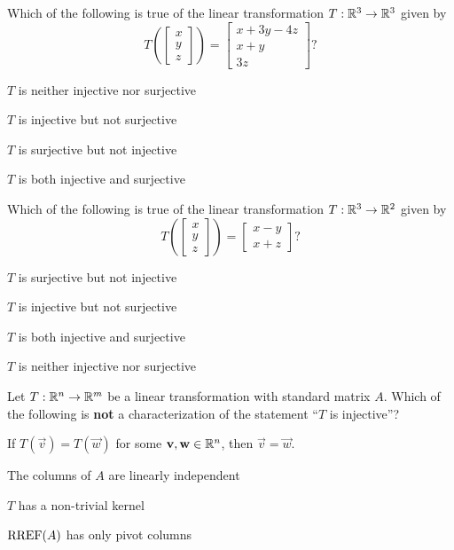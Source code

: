 \begin{readinessAssuranceTest}
\item Which of the following is true of the linear transformation $T: \mathbb{R}^3 \rightarrow \mathbb{R}^3$ given by $$T\left(\begin{bmatrix} x \\ y \\ z \end{bmatrix} \right) = \begin{bmatrix} x+3y-4z \\ x+y \\ 3z \end{bmatrix}?$$
\begin{readinessAssuranceTestChoices}
\item $T$ is neither injective nor surjective
\item $T$ is injective but not surjective
\item $T$ is surjective but not injective
\item $T$ is both injective and surjective %
\end{readinessAssuranceTestChoices}


\item Which of the following is true of the linear transformation $T:\mathbb{R}^3 \rightarrow \mathbb{R}^2$ given by $$T\left(\begin{bmatrix} x \\ y \\ z \end{bmatrix} \right) = \begin{bmatrix} x-y \\ x+z \end{bmatrix} ?$$
\begin{readinessAssuranceTestChoices}
\item $T$ is surjective but not injective %
\item $T$ is injective but not surjective
\item $T$ is both injective and surjective
\item $T$ is neither injective nor surjective
\end{readinessAssuranceTestChoices}


\item Let $T: \mathbb{R}^n \rightarrow \mathbb{R}^m$ be a linear transformation with standard matrix $A$.  Which of the following is {\bf not} a characterization of the statement ``$T$ is injective''?
\begin{readinessAssuranceTestChoices}
\item If $T(\vec{v})=T(\vec{w})$ for some $\mathbf{v}, \mathbf{w} \in \mathbb{R}^n$, then $\vec{v}=\vec{w}$.
\item The columns of $A$ are linearly independent
\item $T$ has a non-trivial kernel %
\item $\operatorname{RREF}(A)$ has only pivot columns
\end{readinessAssuranceTestChoices}



\end{readinessAssuranceTest}
